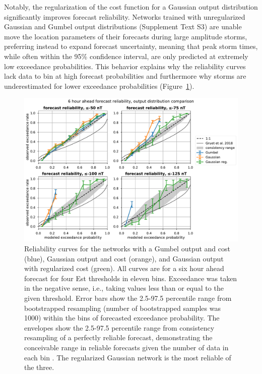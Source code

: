\documentclass[draft,linenumbers]{agujournal2018}
\begin{document}
Notably, the regularization of the cost function for a Gaussian output distribution significantly improves forecast reliability. Networks trained with unregularized Gaussian and Gumbel output distributions (Supplement Text S3) are unable move the location parameters of their forecasts during large amplitude storms, preferring instead to expand forecast uncertainty, meaning that peak storm times, while often within the 95\% confidence interval, are only predicted at extremely low exceedance probabilities. This behavior explains why the reliability curves lack data to bin at high forecast probabilities and furthermore why storms are underestimated for lower exceedance probabilities (Figure~\ref{fig:reliability}).

\begin{figure}[htbp]
  \centering
  \includegraphics[width=1.0\textwidth]{figures/est_forecast_reliability_distcompare_t+6.pdf} 
  \caption{Reliability curves for the networks with a Gumbel output and cost (blue), Gaussian output and cost (orange), and Gaussian output with regularized cost (green). All curves are for a six hour ahead forecast for four Est thresholds in eleven bins. Exceedance was taken in the negative sense, i.e., taking values less than or equal to the given threshold. Error bars show the 2.5-97.5 percentile range from bootstrapped resampling (number of bootstrapped samples was 1000) within the bins of forecasted exceedance probability. The envelopes show the 2.5-97.5 percentile range from consistency resampling of a perfectly reliable forecast, demonstrating the conceivable range in reliable forecasts given the number of data in each bin \citep{Brocker2007}. The regularized Gaussian network is the most reliable of the three. }
  \label{fig:reliability}
\end{figure}
\end{document}
